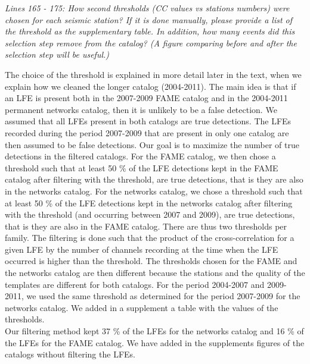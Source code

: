 \documentclass[letterpaper, 12pt]{article}
\begin{document}
\bigskip

\textit{Lines 165 - 175: How second thresholds (CC values vs stations numbers) were chosen for each seismic station? If it is done manually, please provide a list of the threshold as the supplementary table. In addition, how many events did this selection step remove from the catalog? (A figure comparing before and after the selection step will be useful.)}

\bigskip

The choice of the threshold is explained in more detail later in the text, when we explain how we cleaned the longer catalog (2004-2011). The main idea is that if an LFE is present both in the 2007-2009 FAME catalog and in the 2004-2011 permanent networks catalog, then it is unlikely to be a false detection. We assumed that all LFEs present in both catalogs are true detections. The LFEs recorded during the period 2007-2009 that are present in only one catalog are then assumed to be false detections. Our goal is to maximize the number of true detections in the filtered catalogs. For the FAME catalog, we then chose a threshold such that at least 50 \% of the LFE detections kept in the FAME catalog after filtering with the threshold, are true detections, that is they are also in the networks catalog. For the networks catalog, we chose a threshold such that at least 50 \% of the LFE detections kept in the networks catalog after filtering with the threshold (and occurring between 2007 and 2009), are true detections, that is they are also in the FAME catalog. There are thus two thresholds per family. The filtering is done such that the product of the cross-correlation for a given LFE by the number of channels recording at the time when the LFE occurred is higher than the threshold. The thresholds chosen for the FAME and the networks catalog are then different because the stations and the quality of the templates are different for both catalogs. For the period 2004-2007 and 2009-2011, we used the same threshold as determined for the period 2007-2009 for the networks catalog. We added in a supplement a table with the values of the thresholds. \\

Our filtering method kept 37 \% of the LFEs for the networks catalog and 16 \% of the LFEs for the FAME catalog. We have added in the supplements figures of the catalogs without filtering the LFEs.

\bigskip
\end{document}
